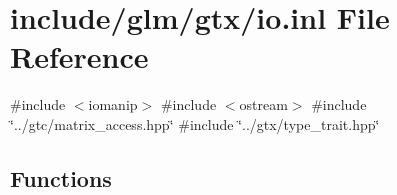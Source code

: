 \hypertarget{io_8inl}{}\section{include/glm/gtx/io.inl File Reference}
\label{io_8inl}
{\ttfamily \#include $<$iomanip$>$}\newline
{\ttfamily \#include $<$ostream$>$}\newline
{\ttfamily \#include \char`\"{}../gtc/matrix\+\_\+access.\+hpp\char`\"{}}\newline
{\ttfamily \#include \char`\"{}../gtx/type\+\_\+trait.\+hpp\char`\"{}}\newline
\subsection*{Functions}

